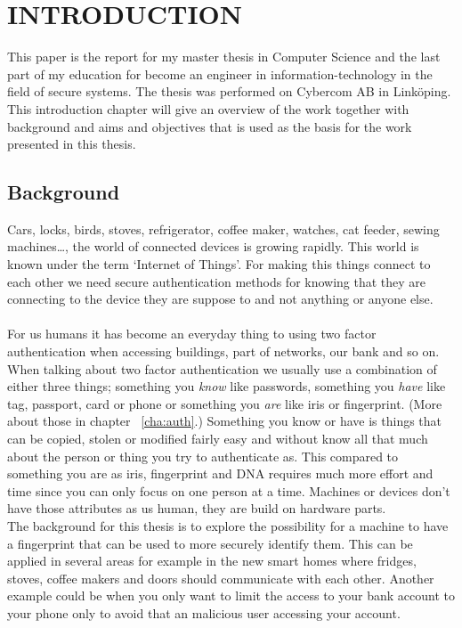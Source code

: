 \chapter{INTRODUCTION}\label{cha:intro}
This paper is the report for my master thesis in Computer Science and the last part of my education for become an engineer in information-technology in the field of secure systems. The thesis was performed on Cybercom AB in Linköping. \\
This introduction chapter will give an overview of the work together with background and aims and objectives that is used as the basis for the work presented in this thesis. 

\section{Background}\label{sec:bg}
Cars, locks, birds, stoves, refrigerator, coffee maker, watches, cat feeder, sewing machines\dots, the world of connected devices is growing rapidly. This world is known under the term `Internet of Things'. For making this things connect to each other we need secure authentication methods for knowing that they are connecting to the device they are suppose to and not anything or anyone else. \\
\\
For us humans it has become an everyday thing to using two factor authentication when accessing buildings, part of networks, our bank and so on. When talking about two factor authentication we usually use a combination of either three things; something you \textit{know} like passwords, something you \textit{have} like tag, passport, card or phone or something you \textit{are} like iris or fingerprint.
(More about those in chapter ~\ref{cha:auth}.)
Something you know or have is things that can be copied, stolen or modified fairly easy and without know all that much about the person or thing you try to authenticate as. This compared to something you are as iris, fingerprint and DNA requires much more effort and time since you can only focus on one person at a time. Machines or devices don't have those attributes as us human, they are build on hardware parts.\\ The background for this thesis is to explore the possibility for a machine to have a fingerprint that can be used to more securely identify them. This can be applied in several areas for example in the new smart homes where fridges, stoves, coffee makers and doors should communicate with each other. Another example could be when you only want to limit the access to your bank account to your phone only to avoid that an malicious user accessing your account.

